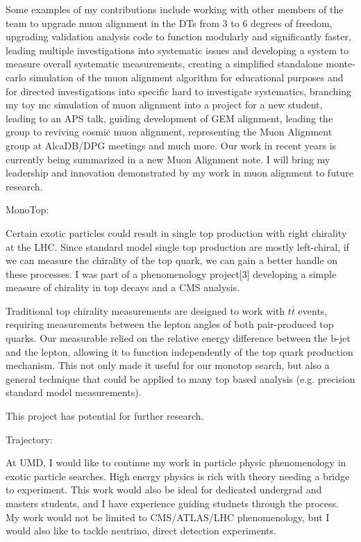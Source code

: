 \documentclass[11pt]{article}
\begin{document}
 Some examples of my contributions include working with other members of the team to upgrade muon alignment in the DTs from 3 to 6 degrees of freedom, upgrading validation analysis code to function modularly and significantly faster, leading multiple investigations into systematic issues and developing a system to measure overall systematic measurements, creating a simplified standalone monte-carlo simulation of the muon alignment algorithm for educational purposes and for directed investigations into specific hard to investigate systematics, branching my toy mc simulation of muon alignment into a project for a new student, leading to an APS talk, guiding development of GEM alignment,  leading the group to reviving cosmic muon alignment, representing the Muon Alignment group at AlcaDB/DPG meetings and much more. Our work in recent years is currently being summarized in a new Muon Alignment note. I will bring my leadership and innovation demonstrated by my work in muon alignment to future research. 
 
 
 MonoTop:
 
 Certain exotic particles could result in single top production with right chirality at the LHC. Since standard model single top production are mostly left-chiral, if we can measure the chirality of the top quark, we can gain a better handle on these processes. I was part of a phenomenology project[3] developing a simple measure of chirality in top decays and a CMS analysis. 
 
 Traditional top chirality measurements are designed to work with $t\bar{t}$ events, requiring measurements between the lepton angles of both pair-produced top quarks. Our measurable relied on the relative energy difference between the b-jet and the lepton, allowing it to function independently of the top quark production mechanism. This not only made it useful for our monotop search, but also a general technique that could be applied to many top based analysis (e.g. precision standard model measurements).
 
This project has potential for further research. 


Trajectory:

At UMD, I would like to continue my work in particle physic phenomenology in exotic particle searches. High energy physics is rich with theory needing a bridge to experiment. This work would also be ideal for dedicated undergrad and masters students, and I have experience guiding studnets through the process. My work would not be limited to CMS/ATLAS/LHC phenomenology, but I would also like to tackle neutrino, direct detection experiments. 
\end{document}
